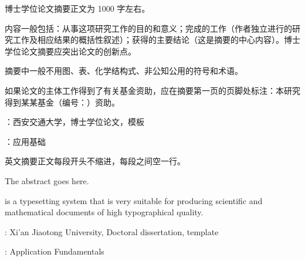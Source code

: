 
\setcounter{page}{1}

博士学位论文摘要正文为 1000 字左右。

内容一般包括：从事这项研究工作的目的和意义；完成的工作（作者独立进行的研究工作及相应结果的概括性叙述）；获得的主要结论（这是摘要的中心内容）。博士学位论文摘要应突出论文的创新点。

摘要中一般不用图、表、化学结构式、非公知公用的符号和术语。

如果论文的主体工作得到了有关基金资助，应在摘要第一页的页脚处标注：本研究得到某某基金（编号：）资助。


\vspace{\baselineskip}
：西安交通大学，博士学位论文，模板

\vspace{\baselineskip}
：应用基础

\clearpage


\noindent 英文摘要正文每段开头不缩进，每段之间空一行。\newline

\noindent The abstract goes here. \newline

\noindent {} is a typesetting system that is very suitable for producing scientific and mathematical documents of high typographical quality.

\vspace{\baselineskip}
: Xi'an Jiaotong University, Doctoral dissertation,  template

\vspace{\baselineskip}
: Application Fundamentals

\clearpage
